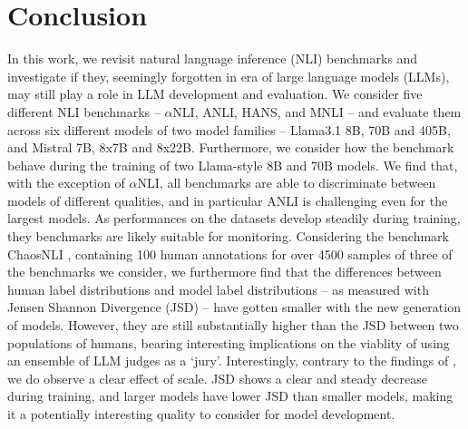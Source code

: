 \section{Conclusion}

In this work, we revisit natural language inference (NLI) benchmarks and investigate if they, seemingly forgotten in era of large language models (LLMs), may still play a role in LLM development and evaluation.
We consider five different NLI benchmarks -- $\alpha$NLI, ANLI, HANS, and MNLI -- and evaluate them across six different models of two model families -- Llama3.1 8B, 70B and 405B, and Mistral 7B, 8x7B and 8x22B.
Furthermore, we consider how the benchmark behave during the training of two Llama-style 8B and 70B models.
We find that, with the exception of $\alpha$NLI, all benchmarks are able to discriminate between models of different qualities, and in particular ANLI is challenging even for the largest models.
As performances on the datasets develop steadily during training, they benchmarks are likely suitable for monitoring.
Considering the benchmark ChaosNLI \citep{nie-etal-2020-learn}, containing 100 human annotations for over 4500 samples of three of the benchmarks we consider, we furthermore find that the differences between human label distributions and model label distributions -- as measured with Jensen Shannon Divergence (JSD) -- have gotten smaller with the new generation of models.
However, they are still substantially higher than the JSD between two populations of humans, bearing interesting implications on the viablity of using an ensemble of LLM judges as a `jury'.
Interestingly, contrary to the findings of \citet{nie-etal-2020-learn}, we do observe a clear effect of scale.
JSD shows a clear and steady decrease during training, and larger models have lower JSD than smaller models, making it a potentially interesting quality to consider for model development.

% 
